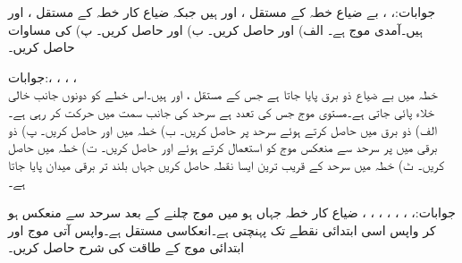 جوابات:، ، 
بے ضیاع خطہ  کے مستقل ،  اور  ہیں جبکہ ضیاع کار خطہ  کے مستقل ،  اور  ہیں۔آمدی موج  ہے۔ الف)  اور  حاصل کریں۔ ب)  اور
  حاصل کریں۔ پ)  کی مساوات حاصل کریں۔

جوابات:، ، ، ،\\
خطہ  میں بے ضیاع ذو برق پایا جاتا ہے جس  کے مستقل ،  اور  ہیں۔اس خطے کو دونوں جانب خالی خلاء پائی جاتی ہے۔مستوی موج جس کی تعدد  ہے سرحد  کی جانب  سمت میں حرکت کر رہی ہے۔ الف)  ذو برق میں  حاصل کرتے ہوئے سرحد  پر  حاصل کریں۔ ب) خطہ  میں  اور  حاصل کریں۔ پ) ذو برقی میں  پر سرحد سے منعکس موج کو استعمال کرتے ہوئے  اور  حاصل کریں۔ ت) خطہ  میں  حاصل کریں۔ ٹ) خطہ  میں سرحد کے قریب ترین ایسا نقطہ حاصل کریں جہاں بلند تر برقی میدان پایا جاتا ہے۔ 

جوابات:، ، ، ، ، ، ، 
ضیاع کار خطہ جہاں  ہو میں موج  چلنے کے بعد سرحد سے منعکس ہو کر واپس اسی ابتدائی نقطے تک پہنچتی ہے۔انعکاسی مستقل  ہے۔واپس آتی موج اور ابتدائی موج کے طاقت کی شرح حاصل کریں۔

